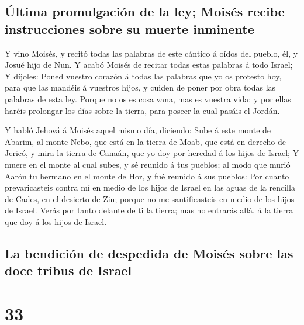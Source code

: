 \hypertarget{uxfaltima-promulgaciuxf3n-de-la-ley-moisuxe9s-recibe-instrucciones-sobre-su-muerte-inminente}{%
\subsection{Última promulgación de la ley; Moisés recibe instrucciones
sobre su muerte
inminente}\label{uxfaltima-promulgaciuxf3n-de-la-ley-moisuxe9s-recibe-instrucciones-sobre-su-muerte-inminente}}

 Y vino Moisés, y recitó todas las palabras de este
cántico á oídos del pueblo, él, y Josué hijo de Nun.  Y
acabó Moisés de recitar todas estas palabras á todo Israel;
 Y díjoles: Poned vuestro corazón á todas las palabras
que yo os protesto hoy, para que las mandéis á vuestros hijos, y cuiden
de poner por obra todas las palabras de esta ley.  Porque
no os es cosa vana, mas es vuestra vida: y por ellas haréis prolongar
los días sobre la tierra, para poseer la cual pasáis el Jordán.

 Y habló Jehová á Moisés aquel mismo día, diciendo:
 Sube á este monte de Abarim, al monte Nebo, que está en
la tierra de Moab, que está en derecho de Jericó, y mira la tierra de
Canaán, que yo doy por heredad á los hijos de Israel;  Y
muere en el monte al cual subes, y sé reunido á tus pueblos; al modo que
murió Aarón tu hermano en el monte de Hor, y fué reunido á sus pueblos:
 Por cuanto prevaricasteis contra mí en medio de los
hijos de Israel en las aguas de la rencilla de Cades, en el desierto de
Zin; porque no me santificasteis en medio de los hijos de Israel.
 Verás por tanto delante de ti la tierra; mas no entrarás
allá, á la tierra que doy á los hijos de Israel.

\hypertarget{la-bendiciuxf3n-de-despedida-de-moisuxe9s-sobre-las-doce-tribus-de-israel}{%
\subsection{La bendición de despedida de Moisés sobre las doce tribus de
Israel}\label{la-bendiciuxf3n-de-despedida-de-moisuxe9s-sobre-las-doce-tribus-de-israel}}

\hypertarget{section-05-33}{%
\section{33}\label{section-05-33}}

